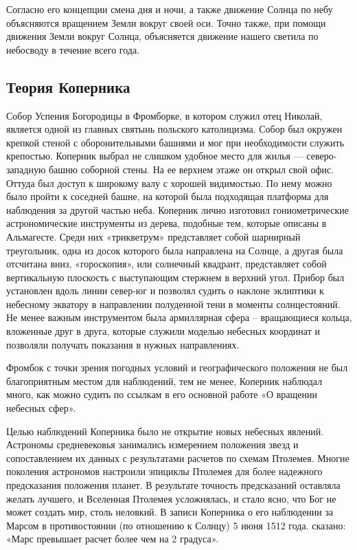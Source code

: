 \documentclass[a4paper, 14pt]{extreport}
\begin{document}
Согласно его концепции смена дня и ночи, а также движение Солнца по небу
объясняются вращением Земли вокруг своей оси. Точно также, при помощи
движения Земли вокруг Солнца, объясняется движение нашего светила по
небосводу в течение всего года.

\subsection{Теория Коперника}

Собор Успения Богородицы в Фромборке, в котором служил отец Николай,
является одной из главных святынь польского католицизма. Собор был
окружен крепкой стеной с оборонительными башнями и мог при необходимости
служить крепостью. Коперник выбрал не слишком удобное место для жилья
--- северо-западную башню соборной стены. На ее верхнем этаже он открыл
свой офис. Оттуда был доступ к широкому валу с хорошей видимостью. По
нему можно было пройти к соседней башне, на которой была подходящая
платформа для наблюдения за другой частью неба. Коперник лично изготовил
гониометрические астрономические инструменты из дерева, подобные тем,
которые описаны в Альмагесте. Среди них «трикветрум» представляет собой
шарнирный треугольник, одна из досок которого была направлена
\hspace{0pt}\hspace{0pt}на Солнце, а другая была отсчитана вниз,
«гороскопия», или солнечный квадрант, представляет собой вертикальную
плоскость с выступающим стержнем в верхний угол. Прибор был установлен
вдоль линии север-юг и позволял судить о наклоне эклиптики к небесному
экватору в направлении полуденной тени в моменты солнцестояний. Не менее
важным инструментом была армиллярная сфера -- вращающиеся кольца,
вложенные друг в друга, которые служили моделью небесных координат и
позволяли получать показания в нужных направлениях.

Фромбок с точки зрения погодных условий и географического положения не
был благоприятным местом для наблюдений, тем не менее, Коперник наблюдал
много, как можно судить по ссылкам в его основной работе «О вращении
небесных сфер».

Целью наблюдений Коперника было не открытие новых небесных явлений.
Астрономы средневековья занимались измерением положения звезд и
сопоставлением их данных с результатами расчетов по схемам Птолемея.
Многие поколения астрономов настроили эпициклы Птолемея для более
надежного предсказания положения планет. В результате точность
предсказаний оставляла желать лучшего, и Вселенная Птолемея усложнялась,
и стало ясно, что Бог не может создать мир, столь неловкий. В записи
Коперника о его наблюдении за Марсом в противостоянии (по отношению к
Солнцу) 5 июня 1512 года. сказано: «Марс превышает расчет более чем на 2
градуса».
\end{document}
